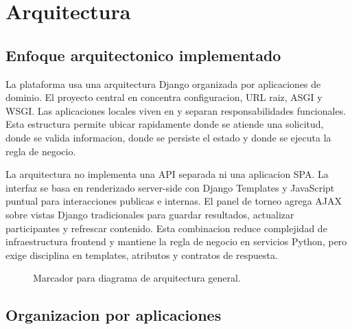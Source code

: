 \chapter{Arquitectura}
\label{chap:arquitectura}

\section{Enfoque arquitectonico implementado}
\label{sec:arquitectura-enfoque}

La plataforma usa una arquitectura Django organizada por aplicaciones de dominio. El proyecto central en  concentra configuracion, URL raiz, ASGI y WSGI. Las aplicaciones locales viven en  y separan responsabilidades funcionales. Esta estructura permite ubicar rapidamente donde se atiende una solicitud, donde se valida informacion, donde se persiste el estado y donde se ejecuta la regla de negocio.

La arquitectura no implementa una API separada ni una aplicacion SPA. La interfaz se basa en renderizado server-side con Django Templates y JavaScript puntual para interacciones publicas e internas. El panel de torneo agrega AJAX sobre vistas Django tradicionales para guardar resultados, actualizar participantes y refrescar contenido. Esta combinacion reduce complejidad de infraestructura frontend y mantiene la regla de negocio en servicios Python, pero exige disciplina en templates, atributos  y contratos de respuesta.

\begin{figure}[H]
  \centering
  \caption{Marcador para diagrama de arquitectura general.}
  \label{fig:arquitectura-general}
\end{figure}

\section{Organizacion por aplicaciones}
\label{sec:arquitectura-apps}

